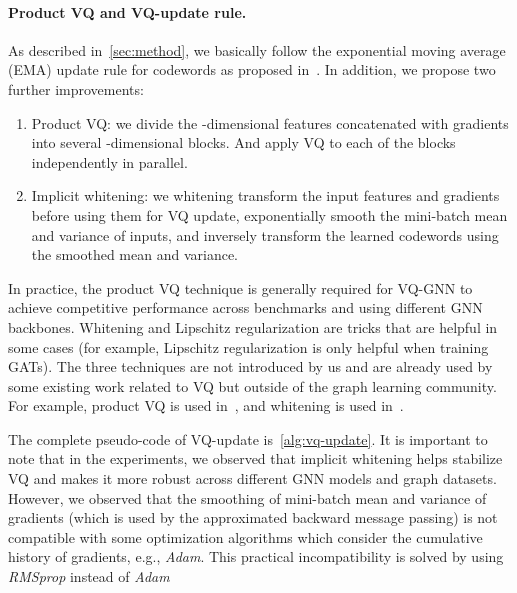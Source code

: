 \documentclass{article}
\newcommand{\cm}{\paragraph}
\renewcommand{\emph}[1]{\textit{#1}}
\begin{document}
\cm{Product VQ and VQ-update rule.}
As described in~\cref{sec:method}, we basically follow the exponential moving average (EMA) update rule for codewords as proposed in~\citep{oord2017neural}. In addition, we propose two further improvements:
\begin{enumerate}[leftmargin=*, noitemsep, topsep=0pt]
    \item Product VQ: we divide the -dimensional features concatenated with gradients into several -dimensional blocks. And apply VQ to each of the blocks independently in parallel.
    \item Implicit whitening: we whitening transform the input features and gradients before using them for VQ update, exponentially smooth the mini-batch mean and variance of inputs, and inversely transform the learned codewords using the smoothed mean and variance.
\end{enumerate}

In practice, the product VQ technique is generally required for VQ-GNN to achieve competitive performance across benchmarks and using different GNN backbones. Whitening and Lipschitz regularization are tricks that are helpful in some cases (for example, Lipschitz regularization is only helpful when training GATs). The three techniques are not introduced by us and are already used by some existing work related to VQ but outside of the graph learning community. For example, product VQ is used in~\citep{wu2019learning}, and whitening is used in~\citep{berthelot2018understanding}.

The complete pseudo-code of VQ-update is~\cref{alg:vq-update}. It is important to note that in the experiments, we observed that implicit whitening helps stabilize VQ and makes it more robust across different GNN models and graph datasets. However, we observed that the smoothing of mini-batch mean and variance of gradients (which is used by the approximated backward message passing) is not compatible with some optimization algorithms which consider the cumulative history of gradients, e.g., \emph{Adam}. This practical incompatibility is solved by using \emph{RMSprop} instead of \emph{Adam}
\end{document}
